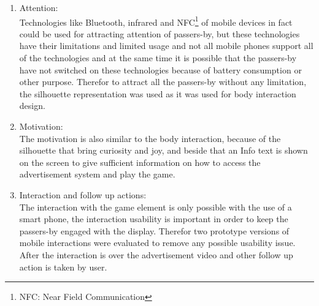\begin{enumerate}

\item Attention: \\
Technologies like Bluetooth, infrared and NFC\footnote{NFC: Near Field Communication} of mobile devices in fact could be used for attracting attention of passers-by, but these technologies have their limitations and limited usage and not all mobile phones support all of the technologies and at the same time it is possible that the passers-by have not switched on these technologies because of battery consumption or other purpose. Therefor to attract all the passers-by without any limitation, the silhouette representation was used as it was used for body interaction design.

\item Motivation: \\
The motivation is also similar to the body interaction, because of the silhouette that bring curiosity and joy, and beside that an Info text is shown on the screen to give sufficient information on how to access the advertisement system and play the game.

\item Interaction and follow up actions: \\
The interaction with the game element is only possible with the use of a smart phone, the interaction usability is important in order to keep the passers-by engaged with the display. Therefor two prototype versions of mobile interactions were evaluated to remove any possible usability issue. After the interaction is over the advertisement video and other follow up action is taken by user.


\end{enumerate}











